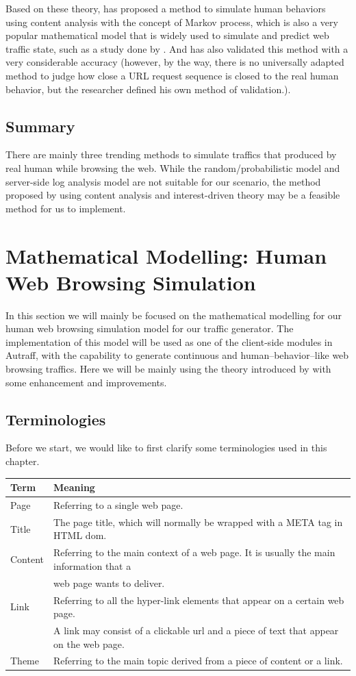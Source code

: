 \documentclass[12pt]{report}
\begin{document}
Based on these theory, \citet{yang} has proposed a method to simulate human behaviors using content analysis with the concept of Markov process, which is also a very popular mathematical model that is widely used to simulate and predict web traffic state, such as a study done by \citet{markov}. And \citet{yang} has also validated this method with a very considerable accuracy (however, by the way, there is no universally adapted method to judge how close a URL request sequence is closed to the real human behavior, but the researcher defined his own method of validation.).


\section{Summary}
There are mainly three trending methods to simulate traffics that produced by real human while browsing the web. While the random/probabilistic model and server-side log analysis model are not suitable for our scenario, the method proposed by \citet{yang} using content analysis and interest-driven theory may be a feasible method for us to implement.


\chapter{Mathematical Modelling: Human Web Browsing Simulation} \label{mm}
In this section we will mainly be focused on the mathematical modelling for our human web browsing simulation model for our traffic generator. The implementation of this model will be used as one of the client-side modules in Autraff, with the capability to generate continuous and human--behavior--like web browsing traffics. Here we will be mainly using the theory introduced by \citet{yang} with some enhancement and improvements. 

\section{Terminologies}
Before we start, we would like to first clarify some terminologies used in this chapter.\\

\setlength{\parindent}{0pt}
\begin{tabular}{ | l | l |}
\hline
\textbf{Term} & \textbf{Meaning} \\
\hline
Page & Referring to a single web page. \\
\hline
Title & The page title, which will normally be wrapped with a META tag in HTML dom.\\
\hline
Content & Referring to the main context of a web page. It is usually the main information that a \\ & web page wants to deliver. \\
\hline
Link & Referring to all the hyper-link elements that appear on a certain web page. \\ & A link may consist of a clickable url and a piece of text that appear on the web page. \\
\hline
Theme & Referring to the main topic derived from a piece of content or a link.\\
\hline
\end{tabular}
\end{document}
